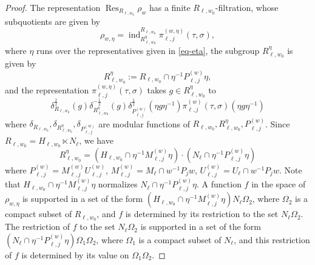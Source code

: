 \documentclass[12pt]{amsart}
\newcommand{\Res}{\operatorname{Res}}
\newcommand{\ind}{\operatorname{ind}}
\theoremstyle{remark}
\begin{document}
\begin{proof}
The representation $\Res_{R_{\ell, w_0}}\rho_w$ has a finite $R_{\ell, w_0}$-filtration, whose subquotients are given by
\begin{equation}
\label{eq-rho_w,eta}
\rho_{w,\eta}=\ind_{R_{\ell,w_0}^{\eta}}^{R_{\ell,w_0}} \pi_{\ell,j}^{(w,\eta)}(\tau,\sigma),	
\end{equation}
where $\eta$ runs over the representatives given in \eqref{eq-eta}, the subgroup $R_{\ell,w_0}^{\eta}$ is given by
 \begin{equation*}
 	R_{\ell,w_0}^{\eta}:=R_{\ell,w_0}\cap \eta^{-1} P_{\ell,j}^{(w)} \eta,
 \end{equation*}
and the representation $\pi_{\ell,j}^{(w,\eta)}(\tau,\sigma)$ takes $g\in R_{\ell,w_0}^{\eta}$ to 
\begin{equation}
\label{eq-ind-action-R^eta}
\delta_{R_{\ell,w_0}}^\frac{1}{2}(g) \delta_{R_{\ell,w_0}^{\eta}}^{-\frac{1}{2}}(g) \delta_{P_{\ell,j}^{(w)}}^{\frac{1}{2}}(\eta g \eta^{-1})	\pi_{\ell, j}^{(w)}(\tau, \sigma)(\eta g \eta^{-1})
\end{equation}
where $\delta_{R_{\ell,w_0}}, \delta_{R_{\ell,w_0}^{\eta}}, \delta_{P_{\ell,j}^{(w)}}$ are modular functions of $R_{\ell,w_0}, R_{\ell,w_0}^{\eta}, P_{\ell,j}^{(w)}$.
Since $R_{\ell, w_0}=H_{\ell,w_0}\ltimes N_{\ell}$, we have
\begin{equation*}
	R_{\ell,w_0}^{\eta}=(H_{\ell,w_0}\cap \eta^{-1} M_{\ell,j}^{(w)} \eta) \cdot (N_{\ell}\cap \eta^{-1} P_{\ell,j}^{(w)} \eta) 
\end{equation*}
where $P_{\ell,j}^{(w)}=M_{\ell,j}^{(w)}U_{\ell,j}^{(w)}$, $M_{\ell, j}^{(w)}=M_{\ell}\cap  w^{-1}P_jw$, $U_{\ell, j}^{(w)}=U_{\ell}\cap  w^{-1}P_jw$. Note that $H_{\ell,w_0}\cap \eta^{-1} M_{\ell,j}^{(w)} \eta$ normalizes $N_{\ell}\cap \eta^{-1} P_{\ell,j}^{(w)} \eta$. A function $f$ in the space of $\rho_{w,\eta}$ is supported in a set of the form 
$(H_{\ell,w_0}\cap \eta^{-1} M_{\ell,j}^{(w)} \eta)N_{\ell} \Omega_2$, where $\Omega_2$ is a compact subset of $R_{\ell,w_0}$, and $f$ is determined by its restriction to the set $N_{\ell} \Omega_2$. The restriction of $f$ to the set $N_{\ell} \Omega_2$ is supported in a set of the form $(N_{\ell}\cap \eta^{-1} P_{\ell,j}^{(w)}\eta)\Omega_1 \Omega_2$, where $\Omega_1$ is a compact subset of $N_{\ell}$, and this restriction of $f$ is determined by its value on $\Omega_1 \Omega_2$. 


\end{proof}
\end{document}
